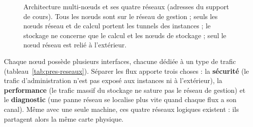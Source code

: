\begin{figure}[!ht]
{}
\caption{Architecture multi-nœuds et ses quatre réseaux (adresses du support de cours). Tous les nœuds sont sur le réseau de
gestion ; seuls les nœuds réseau et de calcul portent les tunnels des instances ; le stockage ne concerne que le calcul et les nœuds
de stockage ; seul le nœud réseau est relié à l'extérieur.}
\label{fig:pres-multi}
\end{figure}

Chaque nœud possède plusieurs interfaces, chacune dédiée à un type de trafic (tableau~\ref{tab:pres-reseaux}). Séparer les flux apporte trois
choses : la \textbf{sécurité} (le trafic d'administration n'est pas exposé aux instances ni à l'extérieur), la \textbf{performance}
(le trafic massif du stockage ne sature pas le réseau de gestion) et le \textbf{diagnostic} (une panne réseau se localise plus vite
quand chaque flux a son canal). Même avec une seule machine, ces quatre réseaux logiques existent : ils partagent alors la même
carte physique.

